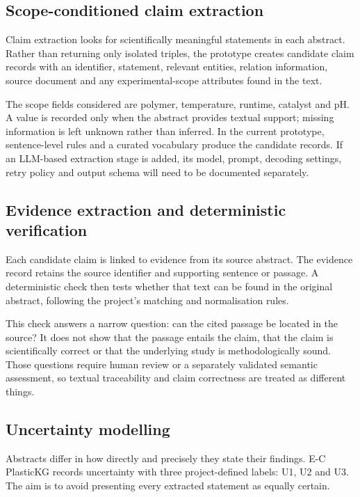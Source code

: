 \documentclass[11pt,a4paper]{article}
\begin{document}
\subsection{Scope-conditioned claim extraction}

Claim extraction looks for scientifically meaningful statements in each abstract. Rather than returning only isolated triples, the prototype creates candidate claim records with an identifier, statement, relevant entities, relation information, source document and any experimental-scope attributes found in the text.

The scope fields considered are polymer, temperature, runtime, catalyst and pH. A value is recorded only when the abstract provides textual support; missing information is left unknown rather than inferred. In the current prototype, sentence-level rules and a curated vocabulary produce the candidate records. If an LLM-based extraction stage is added, its model, prompt, decoding settings, retry policy and output schema will need to be documented separately.

\subsection{Evidence extraction and deterministic verification}

Each candidate claim is linked to evidence from its source abstract. The evidence record retains the source identifier and supporting sentence or passage. A deterministic check then tests whether that text can be found in the original abstract, following the project's matching and normalisation rules.

This check answers a narrow question: can the cited passage be located in the source? It does not show that the passage entails the claim, that the claim is scientifically correct or that the underlying study is methodologically sound. Those questions require human review or a separately validated semantic assessment, so textual traceability and claim correctness are treated as different things.

\subsection{Uncertainty modelling}

Abstracts differ in how directly and precisely they state their findings. E-C PlasticKG records uncertainty with three project-defined labels: U1, U2 and U3. The aim is to avoid presenting every extracted statement as equally certain.
\end{document}
